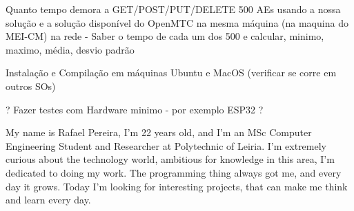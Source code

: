 \documentclass[a4paper,fleqn]{cas-dc}
\begin{document}
Quanto tempo demora a GET/POST/PUT/DELETE 500 AEs usando a nossa solução e a solução disponível do OpenMTC na mesma máquina (na maquina do MEI-CM) na rede - Saber o tempo de cada um dos 500 e calcular, minimo, maximo, média, desvio padrão

Instalação e Compilação em máquinas Ubuntu e MacOS (verificar se corre em outros SOs)

? Fazer testes com Hardware minimo - por exemplo ESP32 ?

\printcredits

%
%




My name is Rafael Pereira, I'm 22 years old, and I'm an MSc Computer Engineering Student and Researcher at Polytechnic of Leiria. I'm extremely curious about the technology world, ambitious for knowledge in this area, I'm dedicated to doing my work. The programming thing always got me, and every day it grows. Today I'm looking for interesting projects, that can make me think and learn every day.
\endbio
\end{document}
